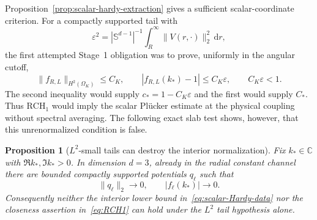 \documentclass[11pt]{article}
\newcommand{\C}{\mathbb C}
\newcommand{\Sd}{\mathbb S^{d-1}}
\newcommand{\dd}{\,\mathrm d}
\newcommand{\eps}{\varepsilon}
\newtheorem{proposition}[theorem]{Proposition}
\theoremstyle{definition}
\theoremstyle{remark}
\begin{document}
Proposition~\ref{prop:scalar-hardy-extraction} gives a sufficient scalar-coordinate criterion.  For a compactly supported tail with
\begin{equation}
 \eps^2=|\Sd|^{-1}\int_R^\infty\|V(r,\cdot)\|_2^2\dd r,
 \label{eq:scalar-epsilon}
\end{equation}
the first attempted Stage~1 obligation was to prove, uniformly in the angular cutoff,
\begin{equation}
 \|f_{R,L}\|_{H^2(\Omega_K)}\leq C_K,
 \qquad
 |f_{R,L}(k_*)-1|\leq C_K\eps,
 \qquad C_K\eps<1.
 \label{eq:RCH1}
\end{equation}
The second inequality would supply $c_*=1-C_K\eps$ and the first would supply $C_*$.  Thus $\mathrm{RCH}_1$ would imply the scalar Pl\"ucker estimate at the physical coupling without spectral averaging.  The following exact slab test shows, however, that this unrenormalized condition is false.

\begin{proposition}[$L^2$-small tails can destroy the interior normalization]\label{prop:RCH1-false}
Fix $k_*\in\C$ with $\Re k_*,\Im k_*>0$.  In dimension $d=3$, already in the radial constant channel there are bounded compactly supported potentials $q_\ell$ such that
\begin{equation}
 \|q_\ell\|_2\longrightarrow0,
 \qquad
 |f_\ell(k_*)|\longrightarrow0.
 \label{eq:RCH1-counterexample-conclusion}
\end{equation}
Consequently neither the interior lower bound in~\eqref{eq:scalar-Hardy-data} nor the closeness assertion in~\eqref{eq:RCH1} can hold under the $L^2$ tail hypothesis alone.
\end{proposition}
\end{document}
